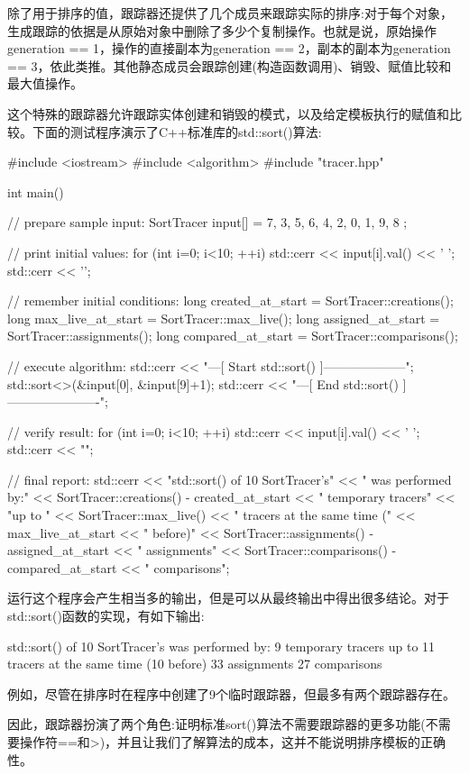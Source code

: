除了用于排序的值，跟踪器还提供了几个成员来跟踪实际的排序:对于每个对象，生成跟踪的依据是从原始对象中删除了多少个复制操作。也就是说，原始操作generation == 1，操作的直接副本为generation == 2，副本的副本为generation == 3，依此类推。其他静态成员会跟踪创建(构造函数调用)、销毁、赋值比较和最大值操作。

这个特殊的跟踪器允许跟踪实体创建和销毁的模式，以及给定模板执行的赋值和比较。下面的测试程序演示了C++标准库的std::sort()算法:

\begin{cpp}
#include <iostream>
#include <algorithm>
#include "tracer.hpp"

int main()
{
	// prepare sample input:
	SortTracer input[] = { 7, 3, 5, 6, 4, 2, 0, 1, 9, 8 };
	
	// print initial values:
	for (int i=0; i<10; ++i) {
		std::cerr << input[i].val() << ' ';
	}
	std::cerr << '\n';
	
	// remember initial conditions:
	long created_at_start = SortTracer::creations();
	long max_live_at_start = SortTracer::max_live();
	long assigned_at_start = SortTracer::assignments();
	long compared_at_start = SortTracer::comparisons();
	
	// execute algorithm:
	std::cerr << "---[ Start std::sort() ]--------------------\n";
	std::sort<>(&input[0], &input[9]+1);
	std::cerr << "---[ End std::sort() ]----------------------\n";
	
	// verify result:
	for (int i=0; i<10; ++i) {
		std::cerr << input[i].val() << ' ';
	}
	std::cerr << "\n\n";
	
	// final report:
	std::cerr << "std::sort() of 10 SortTracer's"
			<< " was performed by:\n "
			<< SortTracer::creations() - created_at_start
			<< " temporary tracers\n "
			<< "up to "
			<< SortTracer::max_live()
			<< " tracers at the same time ("
			<< max_live_at_start << " before)\n "
			<< SortTracer::assignments() - assigned_at_start
			<< " assignments\n "
			<< SortTracer::comparisons() - compared_at_start
			<< " comparisons\n\n";
}
\end{cpp}

运行这个程序会产生相当多的输出，但是可以从最终输出中得出很多结论。对于std::sort()函数的实现，有如下输出:

\begin{shell}
std::sort() of 10 SortTracer's was performed by:
 9 temporary tracers
 up to 11 tracers at the same time (10 before)
 33 assignments
 27 comparisons
\end{shell}

例如，尽管在排序时在程序中创建了9个临时跟踪器，但最多有两个跟踪器存在。

因此，跟踪器扮演了两个角色:证明标准sort()算法不需要跟踪器的更多功能(不需要操作符==和>)，并且让我们了解算法的成本，这并不能说明排序模板的正确性。




































